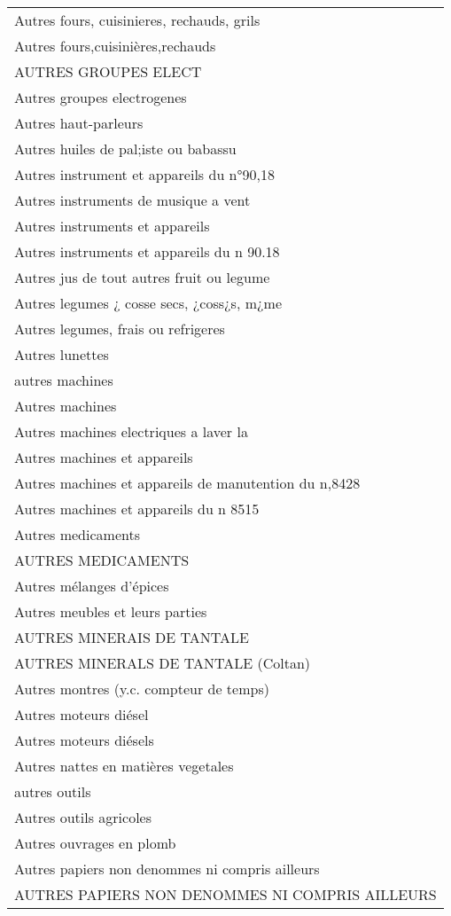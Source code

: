 \documentclass[
]{book}
\begin{document}
\begin{longtable}[t]{l}
Autres fours, cuisinieres, rechauds, grils\\
Autres fours,cuisinières,rechauds\\
\addlinespace
AUTRES GROUPES ELECT\\
Autres groupes electrogenes\\
Autres haut-parleurs\\
Autres huiles de pal;iste ou babassu\\
Autres instrument et appareils du n°90,18\\
\addlinespace
Autres instruments de musique a vent\\
Autres instruments et appareils\\
Autres instruments et appareils du n 90.18\\
Autres jus de tout autres fruit ou legume\\
Autres legumes ¿ cosse secs, ¿coss¿s, m¿me\\
\addlinespace
Autres legumes, frais ou refrigeres\\
Autres lunettes\\
autres machines\\
Autres machines\\
Autres machines electriques a laver la\\
\addlinespace
Autres machines et appareils\\
Autres machines et appareils de manutention du n,8428\\
Autres machines et appareils du n 8515\\
Autres medicaments\\
AUTRES MEDICAMENTS\\
\addlinespace
Autres mélanges d'épices\\
Autres meubles et leurs parties\\
AUTRES MINERAIS DE TANTALE\\
AUTRES MINERALS DE TANTALE (Coltan)\\
Autres montres (y.c. compteur de temps)\\
\addlinespace
Autres moteurs diésel\\
Autres moteurs diésels\\
Autres nattes en matières vegetales\\
autres outils\\
Autres outils agricoles\\
\addlinespace
Autres ouvrages en plomb\\
Autres papiers non denommes ni compris ailleurs\\
AUTRES PAPIERS NON DENOMMES NI COMPRIS AILLEURS\\

\end{longtable}
\end{document}
